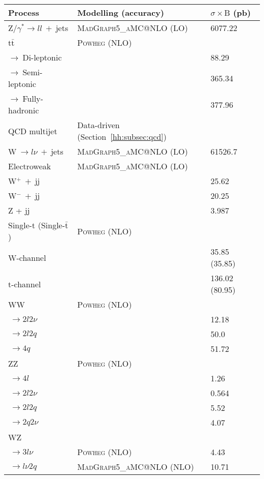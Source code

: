 \documentclass[../main.tex]{subfiles}
\begin{document}
\begin{table}[p]
\begin{footnotesize}
\begin{center}

	\begin{tabular}{l | l | l}
		\hline\hline
		Process & Modelling (accuracy) & $\sigma\times\mathrm{B}$ (pb) \\\hline\hline
		Z/$\gamma^*\to ll~+~$jets & \textsc{MadGraph5\_aMC@NLO} (LO) & 6077.22 \\\hline
		$\text{t}\bar{\text{t}}$ & \textsc{Powheg} (NLO) & \\
		\quad $\to~$Di-leptonic & & 88.29 \\
		\quad $\to~$Semi-leptonic & & 365.34 \\
		\quad $\to~$Fully-hadronic & & 377.96 \\
\hline
	 	QCD multijet & Data-driven (Section~\ref{hh:subsec:qcd}) & \\
\hline
		W$~\to l\nu~+~$jets &  \textsc{MadGraph5\_aMC@NLO} (LO) & 61526.7\\
\hline
		Electroweak & \textsc{MadGraph5\_aMC@NLO} (LO) & \\
		W${}^+~+~$jj & & 25.62 \\
		W${}^-~+~$jj & & 20.25 \\
		Z + jj & & 3.987 \\
\hline
		Single-t (Single-$\bar{\text{t}}$) & \textsc{Powheg} (NLO) & \\
		W-channel & & 35.85 (35.85) \\
		t-channel & & 136.02 (80.95) \\
\hline
		WW & \textsc{Powheg} (NLO) & \\
		\quad$~\to 2l2\nu$ & & 12.18 \\
		\quad$~\to 2l2q$ & & 50.0 \\
		\quad$~\to 4q$ & & 51.72 \\
\hline
		ZZ & \textsc{Powheg} (NLO) & \\
		\quad$~\to 4l$ & & 1.26 \\
		\quad$~\to 2l2\nu$ & & 0.564 \\
		\quad$~\to 2l2q$ & & 5.52 \\
		\quad$~\to 2q2\nu$ & & 4.07 \\
\hline
		WZ & & \\
		\quad$~\to 3l\nu$ & \textsc{Powheg} (NLO) & 4.43 \\
		\quad$~\to l\nu2q$ & \textsc{MadGraph5\_aMC@NLO} (NLO) & 10.71 \\

\end{tabular}
\end{center}
\end{footnotesize}
\end{table}
\end{document}
